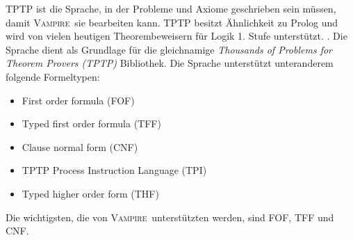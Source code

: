 \documentclass{article}
\newcommand{\vampire}{\textsc{Vampire}~}
\begin{document}
TPTP ist die Sprache, in der Probleme und Axiome geschrieben sein müssen, damit \vampire sie bearbeiten kann. TPTP besitzt Ähnlichkeit zu Prolog und wird von vielen heutigen Theorembeweisern für Logik 1. Stufe unterstützt. \cite[S. 4]{cav2013}. Die Sprache dient als Grundlage für die gleichnamige \textit{Thousands of Problems for Theorem Provers (TPTP)} Bibliothek. Die Sprache unterstützt unteranderem folgende Formeltypen:
\begin{itemize}
	\item First order formula (FOF)
	\item Typed first order formula (TFF)
	\item Clause normal form (CNF)
	\item TPTP Process Instruction Language  (TPI)
	\item Typed higher order form (THF)
\end{itemize}
Die wichtigsten, die von \vampire unterstützten werden, sind FOF, TFF und CNF.
\end{document}
